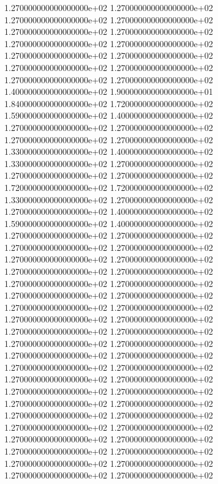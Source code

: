 1.270000000000000000e+02 1.270000000000000000e+02 1.270000000000000000e+02 1.270000000000000000e+02 1.270000000000000000e+02 1.270000000000000000e+02 1.270000000000000000e+02 1.270000000000000000e+02 1.270000000000000000e+02 1.270000000000000000e+02 1.270000000000000000e+02 1.270000000000000000e+02 1.270000000000000000e+02 1.270000000000000000e+02 1.400000000000000000e+02 1.900000000000000000e+01 1.840000000000000000e+02 1.720000000000000000e+02 1.590000000000000000e+02 1.400000000000000000e+02 1.270000000000000000e+02 1.270000000000000000e+02 1.270000000000000000e+02 1.270000000000000000e+02 1.330000000000000000e+02 1.400000000000000000e+02 1.330000000000000000e+02 1.270000000000000000e+02 1.270000000000000000e+02 1.270000000000000000e+02 1.720000000000000000e+02 1.720000000000000000e+02 1.330000000000000000e+02 1.270000000000000000e+02 1.270000000000000000e+02 1.400000000000000000e+02 1.590000000000000000e+02 1.400000000000000000e+02 1.270000000000000000e+02 1.270000000000000000e+02 1.270000000000000000e+02 1.270000000000000000e+02 1.270000000000000000e+02 1.270000000000000000e+02 1.270000000000000000e+02 1.270000000000000000e+02 1.270000000000000000e+02 1.270000000000000000e+02 1.270000000000000000e+02 1.270000000000000000e+02 1.270000000000000000e+02 1.270000000000000000e+02 1.270000000000000000e+02 1.270000000000000000e+02 1.270000000000000000e+02 1.270000000000000000e+02 1.270000000000000000e+02 1.270000000000000000e+02 1.270000000000000000e+02 1.270000000000000000e+02 1.270000000000000000e+02 1.270000000000000000e+02 1.270000000000000000e+02 1.270000000000000000e+02 1.270000000000000000e+02 1.270000000000000000e+02 1.270000000000000000e+02 1.270000000000000000e+02 1.270000000000000000e+02 1.270000000000000000e+02 1.270000000000000000e+02 1.270000000000000000e+02 1.270000000000000000e+02 1.270000000000000000e+02 1.270000000000000000e+02 1.270000000000000000e+02 1.270000000000000000e+02 1.270000000000000000e+02 1.270000000000000000e+02 1.270000000000000000e+02
